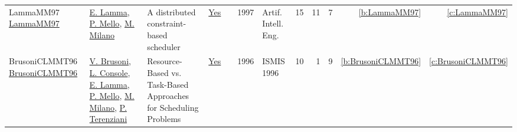 {\begin{longtable}{>{\raggedright\arraybackslash}p{3cm}>{\raggedright\arraybackslash}p{6cm}>{\raggedright\arraybackslash}p{6.5cm}rrrp{2.5cm}rrrrr}
LammaMM97 \href{https://doi.org/10.1016/S0954-1810(96)00002-7}{LammaMM97} & \hyperref[auth:a729]{E. Lamma}, \hyperref[auth:a730]{P. Mello}, \hyperref[auth:a144]{M. Milano} & A distributed constraint-based scheduler & \href{../works/LammaMM97.pdf}{Yes} & \cite{LammaMM97} & 1997 & Artif. Intell. Eng. & 15 & 11 & 7 & \ref{b:LammaMM97} & \ref{c:LammaMM97}\\
BrusoniCLMMT96 \href{https://doi.org/10.1007/3-540-61286-6\_157}{BrusoniCLMMT96} & \hyperref[auth:a731]{V. Brusoni}, \hyperref[auth:a732]{L. Console}, \hyperref[auth:a729]{E. Lamma}, \hyperref[auth:a730]{P. Mello}, \hyperref[auth:a144]{M. Milano}, \hyperref[auth:a733]{P. Terenziani} & Resource-Based vs. Task-Based Approaches for Scheduling Problems & \href{../works/BrusoniCLMMT96.pdf}{Yes} & \cite{BrusoniCLMMT96} & 1996 & ISMIS 1996 & 10 & 1 & 9 & \ref{b:BrusoniCLMMT96} & \ref{c:BrusoniCLMMT96}\\
\end{longtable}
}

\clearpage

